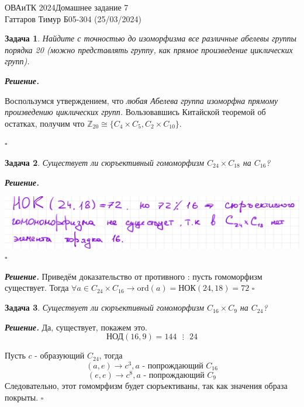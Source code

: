 \documentclass[12pt]{article}
\newtheorem{problem}{Задача}
\newenvironment{solution}[1][\it{Реше\textit{}ние}]{\textbf{#1. } }{$\square$}
\begin{document}
\noindent ОВАиТК 2024\hfill Домашнее задание 7 \\
Гаттаров Тимур Б05-304 (25/03/2024)

\hrulefill

\begin{problem}
    Найдите с точностью до изоморфизма все различные абелевы группы порядка 20 (можно представлять группу, как прямое произведение циклических групп).
\end{problem}

\begin{solution}

Воспользумся утверждением, что \textit{любая Абелева группа изоморфна прямому произведению циклических групп. } Вользовавшись Китайской теоремой об остатках, получим что $\mathbb{Z}_{20} \cong \{C_4 \times C_5, C_2 \times C_{10}\} $.


\end{solution}
\begin{problem}
    Существует ли сюръективный гомоморфизм $C_{24} \times C_{18}$ на $C_{16}$?
\end{problem}
\begin{solution}


    \includegraphics[width = 15cm]{Общая Физика Семинары 2.jpeg}
\end{solution}

\begin{solution}
    Приведём доказательство от противного : пусть гомоморфизм существует. Тогда $\forall a \in C_{24} \times C_{16} \longrightarrow \text{ord} (a) = \text{НОК}(24, 18) = 72$
\end{solution}

\begin{problem}
    Существует ли сюръективный гомоморфизм $C_{16} \times C_{9}$ на $C_{24}$?
\end{problem}

\begin{solution}
    Да, существует, покажем это.
    $$
    \text{НОД}(16, 9) = 144  \text{ }  \vdots \text{ } 24
    $$

    Пусть $c$ - образующий $C_{24}$, тогда
    $$
    (a, e) \longrightarrow c^3, a  \text{ - попрождающий } C_{16}
    $$
    $$
    (e, e) \longrightarrow c^8, a  \text{ - попрождающий } C_{9}
    $$
    Следовательно, этот гомомрфизм будет сюръективаны, так как значения образа покрыты.
\end{solution}
\end{document}
